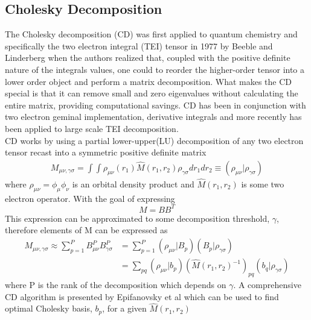 	\subsection{Cholesky Decomposition}
		The Cholesky decomposition (CD) was first applied to quantum chemistry and specifically the two electron integral (TEI) tensor in 1977 by Beeble and Linderberg\cite{Beeble 1977} when the authors realized that, coupled with the positive definite nature of the integrals values, one could to reorder the higher-order tensor into a lower order object and perform a matrix decomposition.  What makes the CD special is that it can remove small and zero eigenvalues without calculating the entire matrix, providing computational savings.  CD has been in conjunction with two electron geminal implementation, derivative integrals and more recently has been applied to large scale TEI decomposition\cite{Aquilante 2011}.\\
		CD works by using a partial lower-upper(LU) decomposition of any two electron tensor recast into a symmetric positive definite matrix 
			\begin{equation}
				\begin{aligned}
					\label{eqn:CD}
					M_{\mu\nu, \gamma\sigma} = \int \int \rho_{\mu\nu}(r_1)\hat{M}(r_1,r_2) \rho_{\gamma\sigma} dr_1 dr_2 \equiv (\rho_{\mu\nu}|\rho_{\gamma\sigma})
				\end{aligned}
			\end{equation}
		where $\rho_{\mu\nu} = \phi_\mu\phi_\nu$ is an orbital density product and $\hat{M}(r_1,r_2)$ is some two electron operator. With the goal of expressing
			\begin{equation}
				M = BB^T
			\end{equation}
		This expression can be approximated to some decomposition threshold, $\gamma$, therefore elements of M can be expressed as
			\begin{equation}
				\begin{aligned}
					M_{\mu\nu, \gamma\sigma} \approx \sum_{p=1}^{P} B_{\mu\nu}^P B_{\gamma\sigma}^P &= \sum_{p=1}^{P} (\rho_{\mu\nu}|B_p)(B_p|\rho_{\gamma\sigma})\\
					&= \sum_{pq} (\rho_{\mu\nu}|b_p)(\hat{M}(r_1,r_2)^{-1})_{pq}(b_q|\rho_{\gamma\sigma})
				\end{aligned}
			\end{equation}
		where P is the rank of the decomposition which depends on $\gamma$.  A comprehensive CD algorithm is presented by Epifanovsky et al\cite{Epifanovsky 2013} which can be used to find optimal Cholesky basis, $b_p$, for a given $\hat{M}(r_1,r_2)$
